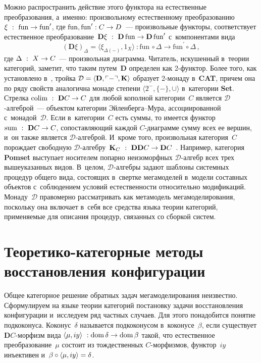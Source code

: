 \begin{multicols}{2}
   Можно распространить действие этого функтора на естественные 
преобразования, а~именно: произвольному естественному преобразованию 
$\xi~:~\mathrm{fun} \hm\to  \mathrm{fun}^\prime$, где 
$\mathrm{fun}, \mathrm{fun}^\prime : C \hm\to D$~--- 
произвольные функторы, соответствует естественное 
преобразование~$\mathbf{D}\xi~:~\mathbf{D}\,\mathrm{fun} \hm \to \mathbf{D}\,\mathrm{fun}^\prime$ 
с~компонентами вида
   $$
(\mathbf{D}\xi)_{\Delta} = \langle \xi_{\Delta(-)}, 1_X\rangle~: \mathrm{fun}\,\circ \Delta \to 
\mathrm{fun}^\prime \circ \Delta\,,
$$
где $\Delta~:~X \hm\to C$~--- произвольная диаграмма. Читатель, искушенный 
в~теории категорий, заметит, что таким путем~$\mathbf{D}$ определен как  
2-функ\-тор. Более того, как установлено в~\cite{14-kov}, тройка $\cal{D}\hm= 
\langle \mathbf{D}, \ulcorner - \urcorner, \mathbf{K}\rangle$ образует 2-мо\-на\-ду 
в~\textbf{CAT}, причем она по ряду свойств аналогична монаде степени $\langle 2^-, \{-
\}, \cup\rangle$ в~категории \textbf{Set}. Стрелка $\mathrm{colim}~:~\mathbf{D}C \hm\to C$ для 
любой кополной категории~$C$ является\linebreak
 $\mathcal{D}$-ал\-геб\-рой~--- 
объектом категории Эй\-лен\-бер\-га--Му\-ра, ассоциированной 
с~монадой~$\mathcal{D}$. Если в~категории~$C$ есть суммы, то имеется 
функтор $\mathrm{sum}~:~\mathbf{D}C \hm\to C$, сопоставляющий каждой  
\mbox{$C$-диа}\-грам\-ме сумму всех ее вершин, и~он также является  
$\mathcal{D}$-ал\-геб\-рой. И~кроме того, произвольная категория~$C$ 
порождает свободную $\mathcal{D}$-ал\-геб\-ру~$\mathbf{K}_C~:~\mathbf{DD}C \hm\to 
\mathbf{D}C$~\cite[предложение~20.7]{15-kov}. Например, категория \textbf{Pomset} 
выступает носителем попарно неизоморфных $\mathcal{D}$-ал\-гебр всех трех 
вышеуказанных видов. В~целом, $\mathcal{D}$-ал\-геб\-ры задают шаблоны 
сис\-тем\-ных процедур общего вида, состоящих в~свертке мегамоделей в~модели 
со\-став\-ных объектов с~соблюдением условий естественности относительно 
модификаций. Монаду~$\mathcal{D}$ правомерно рас\-смат\-ри\-вать как 
метамодель мегамоделирования, поскольку она включает в~себя все средства 
языка теории категорий, применяемые для описания процедур, связанных со 
сборкой сис\-тем.

\section{Теоретико-категорные методы восстановления 
конфигурации}

   Общее категорное решение обратных задач мегамоделирования неизвестно. 
Сформулируем на языке теории категорий постановку задачи восстановления 
конфигурации и~исследуем ряд частных случаев. Для этого понадобится 
понятие подкоконуса. Коконус~$\delta$ называется подкоконусом 
в~ко\-ко\-ну\-се~$\beta$, если существует $\mathbf{D}C$-мор\-физм вида $\langle\mu, 
iy\rangle~: \mathrm{dom}\, \delta \hm\to \mathrm{dom}\, \beta$ такой, что 
естественное преобразование~$\mu$ состоит из тождественных  
$C$-мор\-физ\-мов, функтор~$iy$ инъективен и~$\beta \circ \langle \mu, 
iy\rangle\hm= \delta$. 


\end{multicols}
